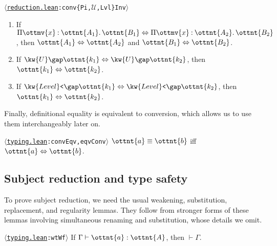 \documentclass[a4paper,UKenglish,cleveref,autoref,thm-restate]{lipics-v2021}
\newcommand{\repo}{https://github.com/ionathanch/TTBFL}
\newcommand{\thmref}[2]{%
  $\langle$\href{\repo/tree/main/src/#1}{\texttt{#1}}\texttt{:#2}$\rangle$%
}
\begin{document}
\begin{lemma} \thmref{reduction.lean}{conv\{Pi,$\mathcal{U}$,Lvl\}Inv}
  \begin{enumerate}[topsep=0pt]
    \item If $  \Pi  \ottmv{x}  \mathbin{:}  \ottnt{A_{{\mathrm{1}}}}  \mathpunct{.}  \ottnt{B_{{\mathrm{1}}}}   \Leftrightarrow   \Pi  \ottmv{x}  \mathbin{:}  \ottnt{A_{{\mathrm{2}}}}  \mathpunct{.}  \ottnt{B_{{\mathrm{2}}}}  $, then $ \ottnt{A_{{\mathrm{1}}}}  \Leftrightarrow  \ottnt{A_{{\mathrm{2}}}} $ and $ \ottnt{B_{{\mathrm{1}}}}  \Leftrightarrow  \ottnt{B_{{\mathrm{2}}}} $.
    \item If $  \kw{U} \gap  \ottnt{k_{{\mathrm{1}}}}   \Leftrightarrow   \kw{U} \gap  \ottnt{k_{{\mathrm{2}}}}  $, then $ \ottnt{k_{{\mathrm{1}}}}  \Leftrightarrow  \ottnt{k_{{\mathrm{2}}}} $.
    \item If $  \kw{Level}\texttt{<} \gap  \ottnt{k_{{\mathrm{1}}}}   \Leftrightarrow   \kw{Level}\texttt{<} \gap  \ottnt{k_{{\mathrm{2}}}}  $, then $ \ottnt{k_{{\mathrm{1}}}}  \Leftrightarrow  \ottnt{k_{{\mathrm{2}}}} $.
  \end{enumerate}
\end{lemma}

Finally, definitional equality is equivalent to conversion,
which allows us to use them interchangeably later on.

\begin{theorem} \thmref{typing.lean}{convEqv,eqvConv} \label{lem:eq-conv}
  $ \ottnt{a}  \equiv  \ottnt{b} $ iff $ \ottnt{a}  \Leftrightarrow  \ottnt{b} $.
\end{theorem}

\subsection{Subject reduction and type safety}

To prove subject reduction,
we need the usual weakening, substitution, replacement, and regularity lemmas.
They follow from stronger forms of these lemmas involving simultaneous renaming and substitution,
whose details we omit.

\begin{lemma} \thmref{typing.lean}{wtWf} \label{lem:wt:wf}
  If $ \Gamma  \vdash  \ottnt{a}  \mathrel{:}  \ottnt{A} $, then $ \mathop{\vdash}  \Gamma $.  
\end{lemma}
\end{document}
